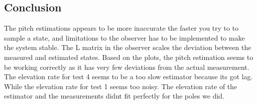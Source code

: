 \subsection{Conclusion}

\vspace{2em}






\noindent
The pitch estimations appears to be more inaccurate the faster you try to
to sample a state, and limitations to the observer has to be implemented to
make the system stable.
The L matrix in the observer scales the deviation between the measured and
estimated states.
\noindent
Based on the plots, the pitch estimation seems to be working correctly as
it has very few deviations from the actual measurement. The elevation rate for test 4 seems to be a too slow estimator because its got lag.
While the elevation rate for test 1 seems too noisy. The elevation rate of the estimator and the measurements didnt fit perfectly for the poles we did.

